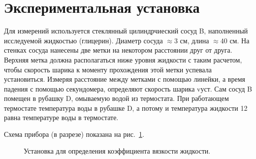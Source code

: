 \documentclass[a4paper,12pt]{article} %
\begin{document}
\section{Экспериментальная установка}
	Для измерений используется стеклянный цилиндрчиеский сосуд B, наполненный исследуемой жидкостью (глицерин). Диаметр сосуда $\approx 3$ см, длина $\approx 40$ см. На стенках сосуда нанесены две метки на некотором расстоянии друг от друга. Верхняя метка должна располагаться ниже уровня жидкости с таким расчетом, чтобы скорость шарика к моменту прохождения этой метки успевала установиться. Измеряя расстояние между метками с помощью линейки, а время падения с помощью секундомера, определяют скорость шарика vуст. Сам сосуд B помещен в рубашку D, омываемую водой из термостата. При работающем термостате температура воды в рубашке D, а потому и температура жидкости 12 равна температуре воды в термостате.
	
	Схема прибора (в разрезе) показана на рис.~\ref{ris:ustanovka}.
		\begin{figure}[H]
		\caption{Установка для определения коэффициента вязкости жидкости.}
		\label{ris:ustanovka}
	\end{figure} 
\end{document}
